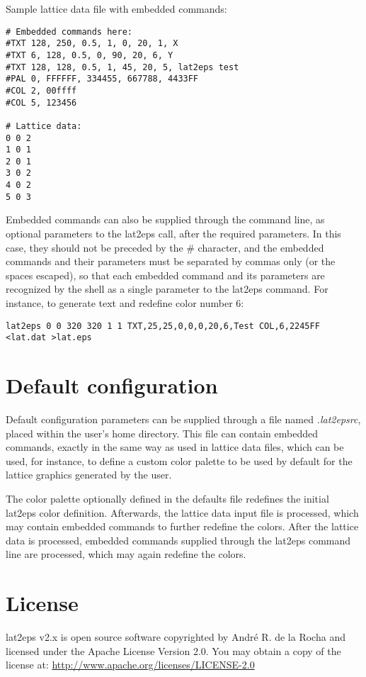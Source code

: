 \documentclass[a4paper]{article}
\begin{document}
Sample lattice data file with embedded commands:
\bigbreak

\begin{lstlisting}
# Embedded commands here:
#TXT 128, 250, 0.5, 1, 0, 20, 1, X
#TXT 6, 128, 0.5, 0, 90, 20, 6, Y
#TXT 128, 128, 0.5, 1, 45, 20, 5, lat2eps test
#PAL 0, FFFFFF, 334455, 667788, 4433FF
#COL 2, 00ffff
#COL 5, 123456

# Lattice data:
0 0 2
1 0 1
2 0 1
3 0 2
4 0 2
5 0 3
\end{lstlisting}

\bigbreak

Embedded commands can also be supplied through the command line, as optional parameters to the lat2eps call, after the required parameters. In this case, they should not be preceded by the \# character, and the embedded commands and their parameters must be separated by commas only (or the spaces escaped), so that each embedded command and its parameters are recognized by the shell as a single parameter to the lat2eps command. For instance, to generate text and redefine color number 6:
\bigbreak

\texttt{lat2eps 0 0 320 320 1 1 TXT,25,25,0,0,0,20,6,Test COL,6,2245FF <lat.dat >lat.eps}
\bigbreak


\section{Default configuration}

Default configuration parameters can be supplied through a file named \textit{.lat2epsrc}, placed within the user's home directory. This file can contain embedded commands, exactly in the same way as used in lattice data files, which can be used, for instance, to define a custom color palette to be used by default for the lattice graphics generated by the user.
\bigbreak

The color palette optionally defined in the defaults file redefines the initial lat2eps color definition. Afterwards, the lattice data input file is processed, which may contain embedded commands to further redefine the colors. After the lattice data is processed, embedded commands supplied through the lat2eps command line are processed, which may again redefine the colors.
\bigbreak


\section{License}

lat2eps v2.x is open source software copyrighted by André R. de la Rocha and licensed under the Apache License Version 2.0. You may obtain a copy of the license at: \url{http://www.apache.org/licenses/LICENSE-2.0}
\end{document}
